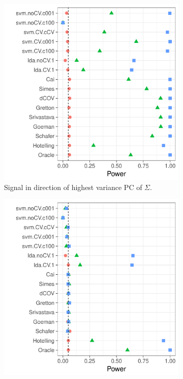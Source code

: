 \documentclass[]{bio}
\begin{document}
\begin{figure}[h]
	\centering
	\begin{subfigure}[t]{.45\columnwidth}
		\centering
		\includegraphics[width=1\columnwidth]{"art/file18"}
		\caption{Signal in direction of highest variance PC of $\Sigma$.} 
		\label{fig:dependence_31}
	\end{subfigure}
	\begin{subfigure}[t]{.45\columnwidth}
		\centering
		\includegraphics[width=1\columnwidth]{"art/file17"}

\end{subfigure}
\end{figure}
\end{document}
